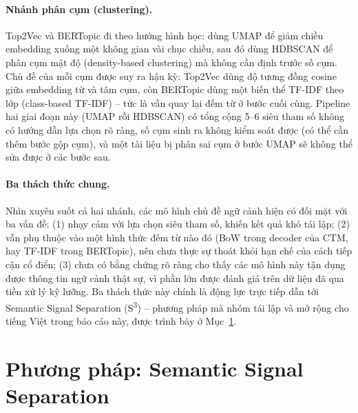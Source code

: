 \documentclass[11pt]{article}
\begin{document}
\paragraph{Nhánh phân cụm (clustering).} Top2Vec \citep{angelov2020top2vec}
và BERTopic \citep{grootendorst2022bertopic} đi theo hướng hình học: dùng
UMAP \citep{mcinnes2018umap} để giảm chiều embedding xuống một không gian
vài chục chiều, sau đó dùng HDBSCAN \citep{campello2013hdbscan} để phân cụm
mật độ (density-based clustering) mà không cần định trước số cụm. Chủ đề
của mỗi cụm được suy ra hậu kỳ: Top2Vec dùng độ tương đồng cosine giữa
embedding từ và tâm cụm, còn BERTopic dùng một biến thể TF-IDF theo lớp
(class-based TF-IDF) -- tức là vẫn quay lại đếm từ ở bước cuối cùng.
Pipeline hai giai đoạn này (UMAP rồi HDBSCAN) có tổng cộng 5--6 siêu tham số
không có hướng dẫn lựa chọn rõ ràng, số cụm sinh ra không kiểm soát được
(có thể cần thêm bước gộp cụm), và một tài liệu bị phân sai cụm ở bước UMAP
sẽ không thể sửa được ở các bước sau.

\paragraph{Ba thách thức chung.} Nhìn xuyên suốt cả hai nhánh, các mô hình
chủ đề ngữ cảnh hiện có đối mặt với ba vấn đề: (1) nhạy cảm với lựa chọn
siêu tham số, khiến kết quả khó tái lập; (2) vẫn phụ thuộc vào một hình
thức đếm từ nào đó (BoW trong decoder của CTM, hay TF-IDF trong BERTopic),
nên chưa thực sự thoát khỏi hạn chế của cách tiếp cận cổ điển; (3) chưa có
bằng chứng rõ ràng cho thấy các mô hình này tận dụng được thông tin ngữ
cảnh thật sự, vì phần lớn được đánh giá trên dữ liệu đã qua tiền xử lý kỹ
lưỡng. Ba thách thức này chính là động lực trực tiếp dẫn tới Semantic
Signal Separation (S\textsuperscript{3}) \citep{kardos2025s3} -- phương
pháp mà nhóm tái lập và mở rộng cho tiếng Việt trong báo cáo này, được
trình bày ở Mục~\ref{sec:method}.

\section{Phương pháp: Semantic Signal Separation}
\label{sec:method}
\end{document}
